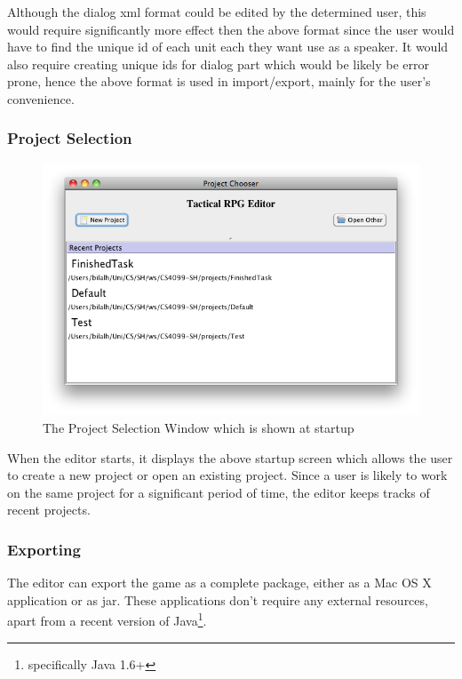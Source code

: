 Although the dialog xml format could be edited by the determined user, this would require significantly more effect then the above format since the user would have to find the unique id  of each unit each they want use as a speaker. It would also require creating unique ids for dialog part which would be likely be error prone, hence the above format is used in import/export, mainly for the user's convenience.

\subsubsection{Project Selection}
\begin{figure}[htbp]
	\centering
		\includegraphics[width=1.05\textwidth]{figures/editor/Project_Selection.png}
	\caption{The Project Selection Window which is shown at startup}
	\label{fig:figures_editor_Project_Selection}
\end{figure}

When the editor starts, it displays the above startup screen which allows the user to create a new project or open an existing project.  Since a user is likely to work on the same project for a significant period of time, the editor keeps tracks of recent projects. 

\clearpage
\subsubsection{Exporting}
\label{ssub:exporting}

The editor can export the game as a complete package, either as a Mac OS X application or as jar. These applications don't require any external resources, apart from a recent version of Java\footnote{specifically Java 1.6+}.


